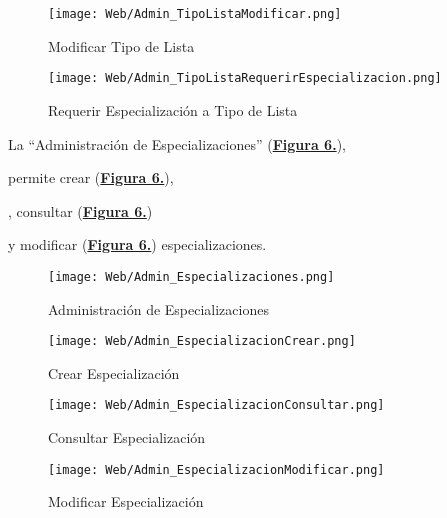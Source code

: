 \begin{figure}[!htbp]
  \centering
  \texttt{[image: Web/Admin\_TipoListaModificar.png]}
  \caption{Modificar Tipo de Lista}
  \label{fig:Web_Admin_TipoListaModificar}
\end{figure}
\FloatBarrier

\begin{figure}[!htbp]
  \centering
  \texttt{[image: Web/Admin\_TipoListaRequerirEspecializacion.png]}
  \caption{Requerir Especialización a Tipo de Lista}
  \label{fig:Web_Admin_TipoListaRequerirEspecializacion}
\end{figure}
\FloatBarrier

\addtocounter{figura_manual}{1} La ``Administración de Especializaciones''  (\textbf{\hyperref[fig:Web_Admin_Especializaciones]{Figura 6.}}),\addtocounter{figura_manual}{1} permite crear (\textbf{\hyperref[fig:Web_Admin_EspecializacionCrear]{Figura 6.}}), \addtocounter{figura_manual}{1}, consultar (\textbf{\hyperref[fig:Web_Admin_EspecializacionConsultar]{Figura 6.}})\addtocounter{figura_manual}{1} y modificar (\textbf{\hyperref[fig:Web_Admin_EspecializacionModificar]{Figura 6.}}) especializaciones.
\begin{figure}[!htbp]
  \centering
  \texttt{[image: Web/Admin\_Especializaciones.png]}
  \caption{Administración de Especializaciones}
  \label{fig:Web_Admin_Especializaciones}
\end{figure}
\FloatBarrier

\begin{figure}[!htbp]
  \centering
  \texttt{[image: Web/Admin\_EspecializacionCrear.png]}
  \caption{Crear Especialización}
  \label{fig:Web_Admin_EspecializacionCrear}
\end{figure}
\FloatBarrier

\begin{figure}[!htbp]
  \centering
  \texttt{[image: Web/Admin\_EspecializacionConsultar.png]}
  \caption{Consultar Especialización}
  \label{fig:Web_Admin_EspecializacionConsultar}
\end{figure}
\FloatBarrier

\begin{figure}[!htbp]
  \centering
  \texttt{[image: Web/Admin\_EspecializacionModificar.png]}
  \caption{Modificar Especialización}
  \label{fig:Web_Admin_EspecializacionModificar}
\end{figure}
\FloatBarrier

